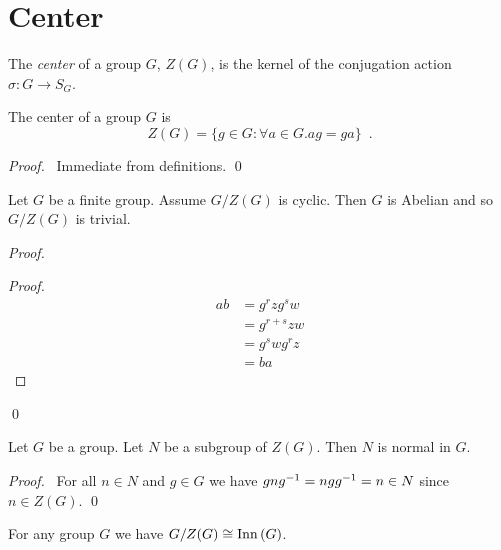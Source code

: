 \section{Center}

\begin{df}[Center]
The \emph{center} of a group $G$, $Z(G)$, is the kernel of the conjugation action $\sigma : G \rightarrow S_G$.
\end{df}

\begin{prop}
The center of a group $G$ is
\[ Z(G) = \{ g \in G : \forall a \in G. ag = ga \} \enspace . \]
\end{prop}

\begin{proof}
\pf\ Immediate from definitions. \qed
\end{proof}

\begin{lm}
\label{lm:G-ZG-cyclic}
Let $G$ be a finite group. Assume $G / Z(G)$ is cyclic. Then $G$ is Abelian and so $G/Z(G)$ is trivial.
\end{lm}

\begin{proof}
\pf
{}
\begin{proof}
	\pf
	\begin{align*}
		ab & = g^rzg^sw \\
		& = g^{r+s}zw \\
		& = g^swg^rz \\
		& = ba
	\end{align*}
\end{proof}
\qed
\end{proof}

\begin{prop}
\label{prop:subgroup-of-Z-normal}
Let $G$ be a group. Let $N$ be a subgroup of $Z(G)$. Then $N$ is normal in $G$.
\end{prop}

\begin{proof}
\pf\ For all $n \in N$ and $g \in G$ we have $gn{g}^{-1} = ng{g}^{-1} = n \in N$ since $n \in Z(G)$. \qed
\end{proof}

\begin{prop}
For any group $G$ we have $G / Z(G) \cong \mathrm{Inn} \left( {G} \right)$.
\end{prop}

